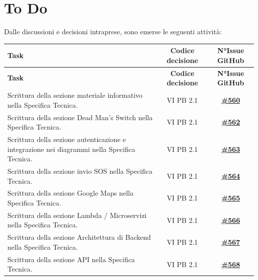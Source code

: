 \documentclass[a4paper,12pt]{article}
\newcommand{\ignoreglossary}{}
\begin{document}
\section{To Do}
Dalle discussioni e decisioni intraprese, sono emerse le seguenti attività:
\small
\renewcommand{\arraystretch}{1.2}
\begin{longtable}{|>{\raggedright\arraybackslash}p{}|c|c|}
\hline
\rowcolor{gray!60}
\textbf{Task} & \textbf{Codice decisione} & \textbf{N°Issue GitHub} \\
\hline
\endfirsthead
\hline
\rowcolor{gray!60}
\textbf{Task} & \textbf{Codice decisione} & \textbf{N°Issue GitHub} \\
\hline
\endhead
\endfoot
\hline
\endlastfoot
\rowcolor{white}
Scrittura della sezione materiale informativo nella Specifica Tecnica. & VI \ignoreglossary{PB} 2.1 & \href{https://github.com/SWE-BitByBit/SWE-docs/issues/560}{\textbf{\#560}} \\
\hline
\rowcolor{gray!20}
Scrittura della sezione Dead Man's Switch nella Specifica Tecnica. & VI \ignoreglossary{PB} 2.1 & \href{https://github.com/SWE-BitByBit/SWE-docs/issues/562}{\textbf{\#562}} \\
\hline
\rowcolor{white}
Scrittura della sezione autenticazione e integrazione nei diagrammi nella Specifica Tecnica. & VI \ignoreglossary{PB} 2.1 & \href{https://github.com/SWE-BitByBit/SWE-docs/issues/563}{\textbf{\#563}} \\
\hline
\rowcolor{gray!20}
Scrittura della sezione invio SOS nella Specifica Tecnica. & VI \ignoreglossary{PB} 2.1 & \href{https://github.com/SWE-BitByBit/SWE-docs/issues/564}{\textbf{\#564}} \\
\hline
\rowcolor{white}
Scrittura della sezione Google Maps nella Specifica Tecnica. & VI \ignoreglossary{PB} 2.1 & \href{https://github.com/SWE-BitByBit/SWE-docs/issues/565}{\textbf{\#565}} \\
\hline
\rowcolor{gray!20}
Scrittura della sezione Lambda / Microservizi nella Specifica Tecnica. & VI \ignoreglossary{PB} 2.1 & \href{https://github.com/SWE-BitByBit/SWE-docs/issues/566}{\textbf{\#566}} \\
\hline
\rowcolor{white}
Scrittura della sezione Architettura di Backend nella Specifica Tecnica. & VI \ignoreglossary{PB} 2.1 & \href{https://github.com/SWE-BitByBit/SWE-docs/issues/567}{\textbf{\#567}} \\
\hline
\rowcolor{gray!20}
Scrittura della sezione API nella Specifica Tecnica. & VI \ignoreglossary{PB} 2.1 & \href{https://github.com/SWE-BitByBit/SWE-docs/issues/568}{\textbf{\#568}} \\

\end{longtable}
\end{document}

